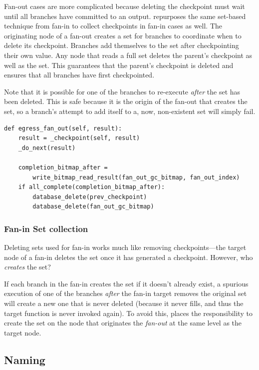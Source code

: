 Fan-out cases are more complicated because deleting the checkpoint must wait
until all branches have committed to an output. \name{} repurposes the same
set-based technique from fan-in to collect checkpoints in fan-in cases as well.
The originating node of a fan-out creates a set for branches to coordinate when
to delete its checkpoint. Branches add themselves to the set after checkpointing
their own value. Any node that reads a full set deletes the parent's checkpoint
as well as the set. This guarantees that the parent's checkpoint is deleted and
ensures that all branches have first checkpointed.

Note that it is possible for one of the branches to re-execute \emph{after} the
set has been deleted. This is safe because it is the origin of the fan-out that
creates the set, so a branch's attempt to add itself to a, now, non-existent set
will simply fail.

\begin{verbatim}
def egress_fan_out(self, result):
    result = _checkpoint(self, result)
    _do_next(result)

    completion_bitmap_after =
        write_bitmap_read_result(fan_out_gc_bitmap, fan_out_index)
    if all_complete(completion_bitmap_after):
        database_delete(prev_checkpoint)
        database_delete(fan_out_gc_bitmap)
\end{verbatim}

\subsubsection{Fan-in Set collection}

Deleting sets used for fan-in works much like removing checkpoints---the target
node of a fan-in deletes the set once it has generated a checkpoint. However,
who \emph{creates} the set?

If each branch in the fan-in creates the set if it doesn't already exist, a
spurious execution of one of the branches \emph{after} the fan-in target removes
the original set will create a new one that is never deleted (because it never
fills, and thus the target function is never invoked again). To avoid this,
\name{} places the responsibility to create the set on the node that originates
the \emph{fan-out} at the same level as the target node.

\subsection{Naming}\label{sec:design:naming}

